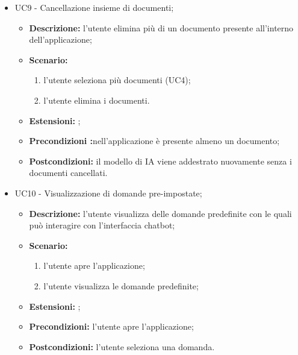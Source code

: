 \documentclass[10pt, a4paper]{article}
\begin{document}
\begin{itemize}
    \item UC9 - Cancellazione insieme di documenti;
    \begin{itemize}
        \item \textbf{Descrizione: }l'utente elimina più di un documento presente all'interno dell'applicazione;
        \item \textbf{Scenario: }
        \begin{enumerate}[label={\arabic*.}, align=left]
        \item l'utente seleziona più documenti (UC4);
        \item l'utente elimina i documenti.
        \end{enumerate}
        \item \textbf{Estensioni: };
        \item \textbf{Precondizioni :}nell'applicazione è presente almeno un documento;
        \item \textbf{Postcondizioni: }il modello di IA viene addestrato nuovamente senza i documenti cancellati.\\ 
    \end{itemize}
  
    \item UC10 - Visualizzazione di domande pre-impostate;
    \begin{itemize}
        \item \textbf{Descrizione: }l'utente visualizza delle domande predefinite con le quali può interagire con l'interfaccia chatbot;
        \item \textbf{Scenario: }
        \begin{enumerate}[label={\arabic*.}, align=left]
            
        \item l'utente apre l'applicazione;
        \item l'utente visualizza le domande predefinite;
        \end{enumerate}
        \item \textbf{Estensioni: };
        \item \textbf{Precondizioni:} l'utente apre l'applicazione;
        \item \textbf{Postcondizioni:} l'utente seleziona una domanda.\\
    \end{itemize}


\end{itemize}
\end{document}
